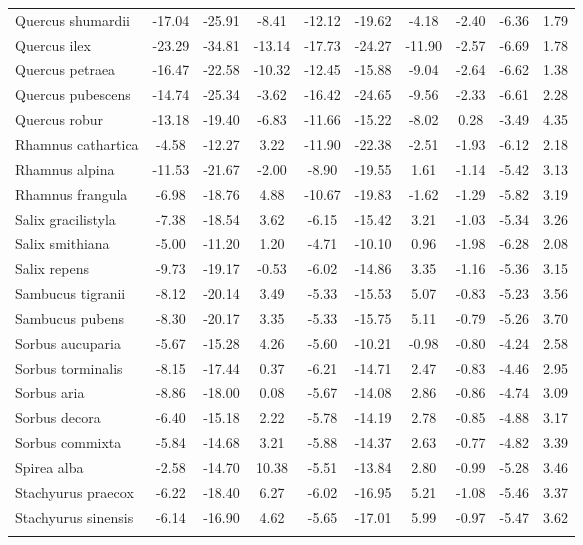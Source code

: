 \documentclass[11pt]{article}
\begin{document}
\begin{longtable}{p{1.50in}c{0.32in}c{0.32in}c{0.32in}c{0.32in}c{0.32in}c{0.32in}c{0.2in}c{0.3in}c{0.1in}}
  Quercus shumardii & -17.04 & -25.91 & -8.41 & -12.12 & -19.62 & -4.18 & -2.40 & -6.36 & 1.79 \\ 
  Quercus ilex & -23.29 & -34.81 & -13.14 & -17.73 & -24.27 & -11.90 & -2.57 & -6.69 & 1.78 \\ 
  Quercus petraea & -16.47 & -22.58 & -10.32 & -12.45 & -15.88 & -9.04 & -2.64 & -6.62 & 1.38 \\ 
  Quercus pubescens & -14.74 & -25.34 & -3.62 & -16.42 & -24.65 & -9.56 & -2.33 & -6.61 & 2.28 \\ 
  Quercus robur & -13.18 & -19.40 & -6.83 & -11.66 & -15.22 & -8.02 & 0.28 & -3.49 & 4.35 \\ 
  Rhamnus cathartica & -4.58 & -12.27 & 3.22 & -11.90 & -22.38 & -2.51 & -1.93 & -6.12 & 2.18 \\ 
  Rhamnus alpina & -11.53 & -21.67 & -2.00 & -8.90 & -19.55 & 1.61 & -1.14 & -5.42 & 3.13 \\ 
  Rhamnus frangula & -6.98 & -18.76 & 4.88 & -10.67 & -19.83 & -1.62 & -1.29 & -5.82 & 3.19 \\ 
  Salix gracilistyla & -7.38 & -18.54 & 3.62 & -6.15 & -15.42 & 3.21 & -1.03 & -5.34 & 3.26 \\ 
  Salix smithiana & -5.00 & -11.20 & 1.20 & -4.71 & -10.10 & 0.96 & -1.98 & -6.28 & 2.08 \\ 
  Salix repens & -9.73 & -19.17 & -0.53 & -6.02 & -14.86 & 3.35 & -1.16 & -5.36 & 3.15 \\ 
  Sambucus tigranii & -8.12 & -20.14 & 3.49 & -5.33 & -15.53 & 5.07 & -0.83 & -5.23 & 3.56 \\ 
  Sambucus pubens & -8.30 & -20.17 & 3.35 & -5.33 & -15.75 & 5.11 & -0.79 & -5.26 & 3.70 \\ 
  Sorbus aucuparia & -5.67 & -15.28 & 4.26 & -5.60 & -10.21 & -0.98 & -0.80 & -4.24 & 2.58 \\ 
  Sorbus torminalis & -8.15 & -17.44 & 0.37 & -6.21 & -14.71 & 2.47 & -0.83 & -4.46 & 2.95 \\ 
  Sorbus aria & -8.86 & -18.00 & 0.08 & -5.67 & -14.08 & 2.86 & -0.86 & -4.74 & 3.09 \\ 
  Sorbus decora & -6.40 & -15.18 & 2.22 & -5.78 & -14.19 & 2.78 & -0.85 & -4.88 & 3.17 \\ 
  Sorbus commixta & -5.84 & -14.68 & 3.21 & -5.88 & -14.37 & 2.63 & -0.77 & -4.82 & 3.39 \\ 
  Spirea alba & -2.58 & -14.70 & 10.38 & -5.51 & -13.84 & 2.80 & -0.99 & -5.28 & 3.46 \\ 
  Stachyurus praecox & -6.22 & -18.40 & 6.27 & -6.02 & -16.95 & 5.21 & -1.08 & -5.46 & 3.37 \\ 
  Stachyurus sinensis & -6.14 & -16.90 & 4.62 & -5.65 & -17.01 & 5.99 & -0.97 & -5.47 & 3.62 \\ 
  \hline
\label{tab:tablesupp1}
\end{longtable}
\end{document}

